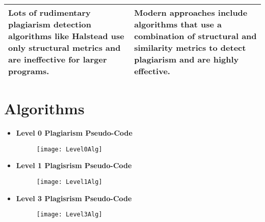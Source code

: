 \begin{table}[!htbp]
\begin{tabular}{|p{6cm}|p{6cm}|}
				
				Lots of rudimentary plagiarism detection algorithms like Halstead use only structural metrics and are ineffective for larger programs. &  Modern approaches include algorithms that use a combination of structural and similarity metrics to detect plagiarism and are highly effective. \\ \hline 
				
				\end{tabular}
						
				
				
				\end{table}  
				
				
				
				
	\pagebreak
				
				\section{Algorithms}
				
				\begin{itemize}
				
				\item \textbf{Level 0 Plagiarism Pseudo-Code}
					\begin{figure}[h]
					\texttt{[image: Level0Alg]}
	  				\label{fig:Level0}
	  				\end{figure}
	  				
				
				\item \textbf{Level 1 Plagisrism Pseudo-Code}
					\begin{figure}[!h]				
					\texttt{[image: Level1Alg]}
	  				\label{fig:Level1}
					\end{figure}
					
				\pagebreak				
	
				\item \textbf{Level 3 Plagisrism Pseudo-Code}\\
					\begin{figure}[h]				
					\texttt{[image: Level3Alg]}
	  				\label{fig:Level3}	
	  				\end{figure}		
				
				\end{itemize} 
				
				
				
				
				
				
				
				
				
				
				
				
				
				
				
				
				
				
				